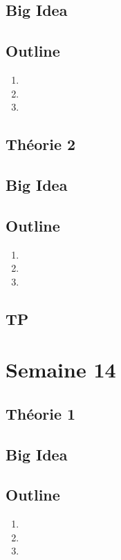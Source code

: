 \documentclass{article}
\begin{document}
\subsection*{Big Idea}
\subsection*{Outline}
    \begin{enumerate}
    \item
    \item
    \item
    \end{enumerate}
\subsection{Théorie 2}
\subsection*{Big Idea}
\subsection*{Outline}
    \begin{enumerate}
    \item
    \item
    \item
    \end{enumerate}
\subsection{TP}

\pagebreak
\section{Semaine 14}
\subsection{Théorie 1}
\subsection*{Big Idea}
\subsection*{Outline}
    \begin{enumerate}
    \item
    \item
    \item
    \end{enumerate}
\end{document}

